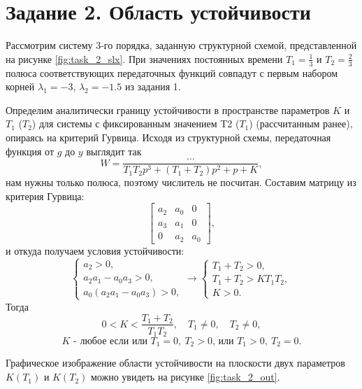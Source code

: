 \section*{Задание 2. Область устойчивости}

Рассмотрим систему 3-го порядка, заданную структурной схемой, представленной
на рисунке \ref{fig:task_2_slx}. При значениях постоянных 
времени $T_1=\frac{1}{3}$ и $T_2=\frac{2}{3}$ полюса соответствующих передаточных функций совпадут 
с первым набором корней $\lambda_1=-3$, $\lambda_2=-1.5$ из задания 1.

Определим аналитически границу устойчивости в пространстве параметров $K$ и $T_1$ ($T_2$)
для системы с фиксированным значением T2 ($T_1$) (рассчитанным ранее), 
опираясь на критерий Гурвица. Исходя из структурной схемы, передаточная функция от 
$g$ до $y$ выглядит так
\begin{equation*}
    W=\frac{\dots}{T_1T_2p^3+(T_1+T_2)p^2+p+K},
\end{equation*}
нам нужны только полюса, поэтому числитель не посчитан. Составим матрицу из критерия
Гурвица:
\begin{equation*}
    \begin{bmatrix}
        a_2&a_0&0\\a_3&a_1&0\\0&a_2&a_0
    \end{bmatrix},
\end{equation*}
и откуда получаем условия устойчивости:
\begin{equation*}
    \begin{cases}
        a_2>0,\\
        a_2a_1-a_0a_3>0,\\
        a_0(a_2a_1-a_0a_3)>0,
    \end{cases}\rightarrow
    \begin{cases}
        T_1+T_2>0,\\
        T_1+T_2>KT_1T_2,\\
        K>0.
    \end{cases}
\end{equation*}
Тогда 
\begin{equation*}
    0<K<\frac{T_1+T_2}{T_1T_2},\quad T_1\neq 0, \quad T_2\neq 0,
\end{equation*}
\begin{equation*}
    \text{$K$ - любое если или $T_1=0,\: T_2>0$, или $T_1>0,\: T_2=0$}.
\end{equation*}

Графическое изображение области устойчивости на плоскости
двух параметров $K(T_1)$ и $K(T_2)$ можно увидеть на рисунке \ref{fig:task_2_out}.

